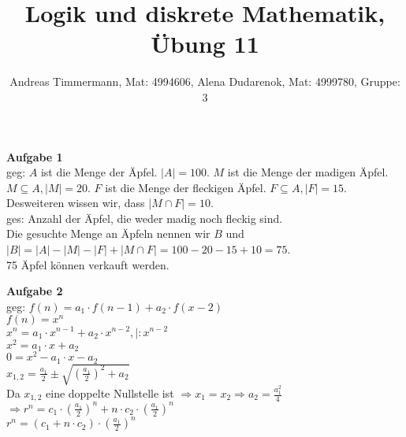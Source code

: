 \documentclass[a4paper]{scrartcl}
\title{Logik und diskrete Mathematik, Übung 11}
\author{Andreas Timmermann, Mat: 4994606, Alena Dudarenok, Mat: 4999780, Gruppe: 3}
\begin{document}
	\maketitle
	\begin{flushleft}
		\textbf{Aufgabe 1}\\
		geg: $A$ ist die Menge der Äpfel. $|A|=100$. $M$ ist die Menge der madigen Äpfel. $M\subseteq A, |M|=20$.  $F$ ist die Menge der fleckigen Äpfel. $F\subseteq A, |F|=15$. Desweiteren wissen wir, dass $|M\cap F|=10$.\\
		ges: Anzahl der Äpfel, die weder madig noch fleckig sind.\\[1em]
		Die gesuchte Menge an Äpfeln nennen wir $B$ und $|B|=|A|-|M|-|F|+|M\cap F| = 100-20-15+10=75$.\\
		75 Äpfel können verkauft werden.\\[1em]
	\end{flushleft}
	\begin{flushleft}
		\textbf{Aufgabe 2}\\
		geg: $f(n)=a_1\cdot f(n-1)+a_2\cdot f(x-2)$\\
		$f(n)=x^n$\\
		$x^n=a_1\cdot x^{n-1}+a_2\cdot x^{n-2}, |:x^{n-2}$\\
		$x^2=a_1\cdot x+a_2$\\
		$0=x^2-a_1\cdot x -a_2$\\
		$x_{1,2}= \frac{a_1}{2}\pm\sqrt{(\frac{a_1}{2})^2+a_2}$\\
		Da $x_{1,2}$ eine doppelte Nullstelle ist $\Rightarrow x_1=x_2\Rightarrow a_2= \frac{a_1^2}{4}$\\
		$\Rightarrow r^n=c_1\cdot(\frac{a_1}{2})^n+n\cdot c_2\cdot(\frac{a_1}{2})^n$\\
		$r^n=(c_1+n\cdot c_2)\cdot(\frac{a_1}{2})^n$\\
	\end{flushleft}
\end{document}
